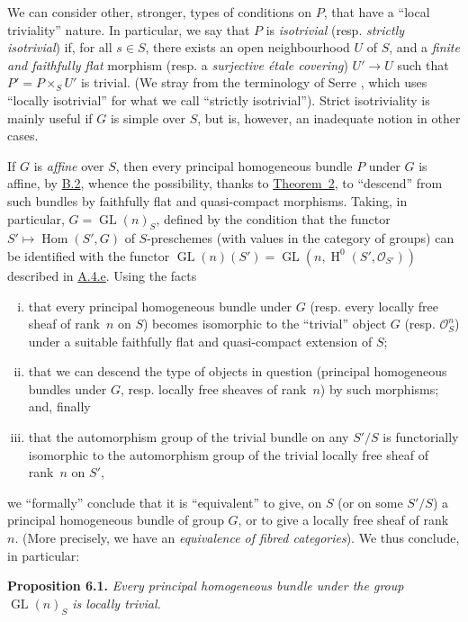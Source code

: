 \documentclass{article}
\newenvironment{itenv}[1]
  {\phantomsection\par\medskip\noindent\textbf{#1.}\itshape}
  {\par\medskip}
\newcommand{\scr}[1]{{\mathscr{#1}}}
\DeclareMathOperator{\Hom}{Hom}
\DeclareMathOperator{\HH}{H}
\DeclareMathOperator{\GL}{GL}
\newcommand{\oldpage}[1]{\marginpar{\footnotesize$\Big\vert$ \textit{p.~#1}}}
\begin{document}
We can consider other, stronger, types of conditions on $P$, that have a ``local triviality'' nature.
In particular, we say that $P$ is \emph{isotrivial} (resp. \emph{strictly isotrivial}) if, for all $s\in S$, there exists an open neighbourhood $U$ of $S$, and a \emph{finite and faithfully flat} morphism (resp. a \emph{surjective \'{e}tale covering}) $U'\to U$ such that $P'=P\times_S U'$ is trivial.
(We stray from the terminology of Serre \cite{1}, which uses ``locally isotrivial'' for what we call ``strictly isotrivial'').
Strict isotriviality is mainly useful if $G$ is simple over $S$, but is, however, an inadequate notion in other cases.

If $G$ is \emph{affine} over $S$, then every principal homogeneous bundle $P$ under $G$ is affine, by \hyperref[B.2]{B.2}, whence the possibility, thanks to \hyperref[theorem:B.1(2)]{Theorem~2}, to ``descend''
\oldpage{190-28}
from such bundles by faithfully flat and quasi-compact morphisms.
Taking, in particular, $G=\GL(n)_S$, defined by the condition that the functor $S'\mapsto\Hom(S',G)$ of $S$-preschemes (with values in the category of groups) can be identified with the functor $\GL(n)(S')=\GL(n,\HH^0(S',\scr{O}_{S'}))$ described in \hyperref[A.4.e]{A.4.e}.
Using the facts
\begin{enumerate}[(i)]
  \item that every principal homogeneous bundle under $G$ (resp. every locally free sheaf of rank~$n$ on $S$) becomes isomorphic to the ``trivial'' object $G$ (resp. $\scr{O}_S^n$) under a suitable faithfully flat and quasi-compact extension of $S$;
  \item that we can descend the type of objects in question (principal homogeneous bundles under $G$, resp. locally free sheaves of rank~$n$) by such morphisms; and, finally
  \item that the automorphism group of the trivial bundle on any $S'/S$ is functorially isomorphic to the automorphism group of the trivial locally free sheaf of rank~$n$ on $S'$,
\end{enumerate}
we ``formally'' conclude that it is ``equivalent'' to give, on $S$ (or on some $S'/S$) a principal homogeneous bundle of group $G$, or to give a locally free sheaf of rank~$n$.
(More precisely, we have an \emph{equivalence of fibred categories}).
We thus conclude, in particular:

\begin{itenv}{Proposition 6.1}
  Every principal homogeneous bundle under the group $\GL(n)_S$ is locally trivial.
\end{itenv}
\end{document}
